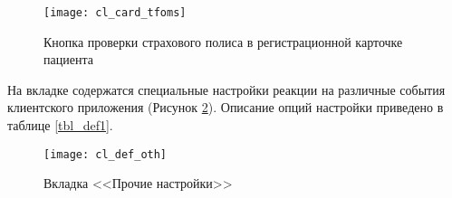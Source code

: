 \begin{figure}[ht]\centering
 \texttt{[image: cl\_card\_tfoms]}
 \caption{Кнопка проверки страхового полиса в регистрационной карточке пациента}
 \label{img_cl_card_tfoms}
\end{figure} 

На вкладке  содержатся специальные настройки реакции на различные события клиентского приложения (Рисунок \ref{img_cl_def_oth}). Описание опций настройки приведено в таблице \ref{tbl_def1}.

\begin{figure}[ht!]\centering
 \texttt{[image: cl\_def\_oth]}
 \caption{Вкладка <<Прочие настройки>>}
 \label{img_cl_def_oth}
\end{figure} 

